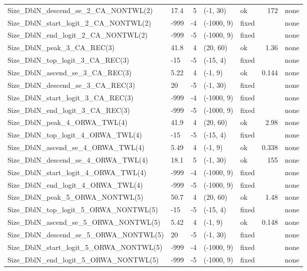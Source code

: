 \documentclass[
]{scrartcl}
\begin{document}
\begin{longtable}{llrllrl}
Size\_DblN\_descend\_se\_2\_CA\_NONTWL(2) & 17.4 & 5 & (-1, 30) & ok & 172 & none \\ 
Size\_DblN\_start\_logit\_2\_CA\_NONTWL(2) & -999 & -4 & (-1000, 9) & fixed &  & none \\ 
Size\_DblN\_end\_logit\_2\_CA\_NONTWL(2) & -999 & -5 & (-1000, 9) & fixed &  & none \\ 
Size\_DblN\_peak\_3\_CA\_REC(3) & 41.8 & 4 & (20, 60) & ok & 1.36 & none \\ 
Size\_DblN\_top\_logit\_3\_CA\_REC(3) & -15 & -5 & (-15, 4) & fixed &  & none \\ 
Size\_DblN\_ascend\_se\_3\_CA\_REC(3) & 5.22 & 4 & (-1, 9) & ok & 0.144 & none \\ 
Size\_DblN\_descend\_se\_3\_CA\_REC(3) & 20 & -5 & (-1, 30) & fixed &  & none \\ 
Size\_DblN\_start\_logit\_3\_CA\_REC(3) & -999 & -4 & (-1000, 9) & fixed &  & none \\ 
Size\_DblN\_end\_logit\_3\_CA\_REC(3) & -999 & -5 & (-1000, 9) & fixed &  & none \\ 
Size\_DblN\_peak\_4\_ORWA\_TWL(4) & 41.9 & 4 & (20, 60) & ok & 2.98 & none \\ 
Size\_DblN\_top\_logit\_4\_ORWA\_TWL(4) & -15 & -5 & (-15, 4) & fixed &  & none \\ 
Size\_DblN\_ascend\_se\_4\_ORWA\_TWL(4) & 5.49 & 4 & (-1, 9) & ok & 0.338 & none \\ 
Size\_DblN\_descend\_se\_4\_ORWA\_TWL(4) & 18.1 & 5 & (-1, 30) & ok & 155 & none \\ 
Size\_DblN\_start\_logit\_4\_ORWA\_TWL(4) & -999 & -4 & (-1000, 9) & fixed &  & none \\ 
Size\_DblN\_end\_logit\_4\_ORWA\_TWL(4) & -999 & -5 & (-1000, 9) & fixed &  & none \\ 
Size\_DblN\_peak\_5\_ORWA\_NONTWL(5) & 50.7 & 4 & (20, 60) & ok & 1.48 & none \\ 
Size\_DblN\_top\_logit\_5\_ORWA\_NONTWL(5) & -15 & -5 & (-15, 4) & fixed &  & none \\ 
Size\_DblN\_ascend\_se\_5\_ORWA\_NONTWL(5) & 5.42 & 4 & (-1, 9) & ok & 0.148 & none \\ 
Size\_DblN\_descend\_se\_5\_ORWA\_NONTWL(5) & 20 & -5 & (-1, 30) & fixed &  & none \\ 
Size\_DblN\_start\_logit\_5\_ORWA\_NONTWL(5) & -999 & -4 & (-1000, 9) & fixed &  & none \\ 
Size\_DblN\_end\_logit\_5\_ORWA\_NONTWL(5) & -999 & -5 & (-1000, 9) & fixed &  & none \\ 

\end{longtable}
\end{document}
